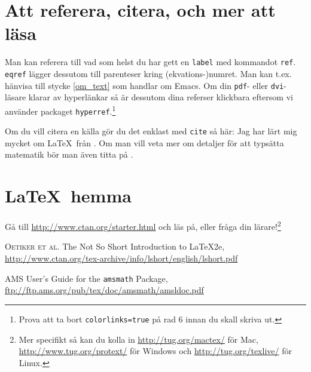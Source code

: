 \documentclass[11pt,a4paper]{article}
\begin{document}
\section{Att referera, citera, och mer att läsa}

Man kan referera till vad som helst du har gett en \texttt{label} med kommandot \texttt{ref}. \texttt{eqref} lägger dessutom till parenteser kring (ekvations-)numret. Man kan t.ex. hänvisa till stycke \ref{om_text} som handlar om Emacs. Om din \texttt{pdf}- eller \texttt{dvi}-läsare klarar av hyperlänkar så är dessutom dina referser klickbara eftersom vi använder packaget \texttt{hyperref}.\footnote{Prova att ta bort \texttt{colorlinks=true} på rad 6 innan du skall skriva ut.}

Om du vill citera en källa gör du det enklast med \texttt{cite} så här:  Jag har lärt mig mycket om \LaTeX\ från \cite{lshort}. Om man vill veta mer om detaljer för att typsätta matematik bör man även titta på \cite{amsmath}.



\section{\LaTeX\ hemma}

Gå till \url{http://www.ctan.org/starter.html} och läs på, eller fråga din lärare!\footnote{Mer specifikt så kan du kolla in \url{http://tug.org/mactex/} för Mac, \url{http://www.tug.org/protext/} för Windows och \url{http://tug.org/texlive/} för Linux.}

\begin{thebibliography}{99} %

\textsc{Oetiker et al.} The Not So Short Introduction to \LaTeX2e,
\url{http://www.ctan.org/tex-archive/info/lshort/english/lshort.pdf}

\textsc{AMS} User's Guide for the \texttt{amsmath} Package,
\url{ftp://ftp.ams.org/pub/tex/doc/amsmath/amsldoc.pdf}

\end{thebibliography}
\end{document}
